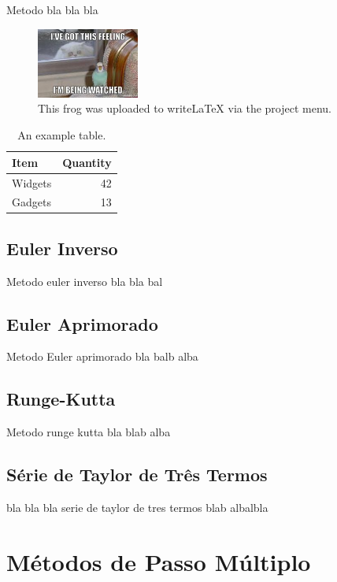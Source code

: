 \documentclass[a4paper]{article}
\begin{document}
Metodo bla bla bla


\begin{figure}[h]
\centering
\includegraphics[width=0.3\textwidth]{watched.jpg}
\caption{\label{fig:frog}This frog was uploaded to writeLaTeX via the project menu.}
\end{figure}

\begin{table}[h]
\centering
\begin{tabular}{l|r}
Item & Quantity \\\hline
Widgets & 42 \\
Gadgets & 13
\end{tabular}
\caption{\label{tab:widgets}An example table.}
\end{table}


\subsection{Euler Inverso}

Metodo euler inverso bla bla bal

\subsection{Euler Aprimorado}

Metodo Euler aprimorado bla balb alba

\subsection{Runge-Kutta}

Metodo runge kutta bla blab alba

\subsection{Série de Taylor de Três Termos}

bla bla bla serie de taylor de tres termos blab albalbla

\section{Métodos de Passo Múltiplo}
\end{document}
